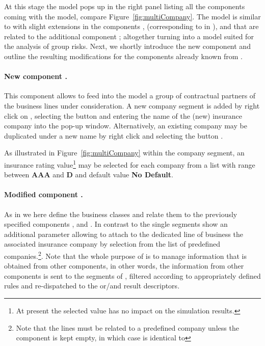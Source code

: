 At this stage the model pops up in the right panel listing all the components coming with the model, compare Figure~\ref{fig:multiCompany}.
The model is similar to \PODRA{} with slight extensions in the components ,   (corresponding to  in \PODRA), and 
that are related to the additional component ; altogether turning \PODRA{} into a model suited for the analysis of group risks.
Next, we shortly introduce the new component and outline the resulting modifications for
the components already known from \PODRA.

\paragraph{New component .}
This component allows to feed into the model a group of contractual partners of the business lines under consideration.
A new company segment is added by right click on , selecting the button  and entering the
name of the (new) insurance company into the pop-up window. Alternatively, an existing company may be duplicated under a new name by right
click and selecting the button .

As illustrated in Figure~\ref{fig:multiCompany} within the company segment, an insurance rating value\footnote{At present the selected value has no impact on the simulation results.} may
be selected for each company from a list with range between \textbf{AAA} and \textbf{D} and default value \textbf{No Default}.


\paragraph{Modified component .}
As in \PODRA{} we here define the business classes and relate them to the previously specified components ,  and . In contrast to \PODRA{} the single segments show an additional parameter  allowing to attach to the dedicated line of business
the associated insurance company by selection from the list of predefined companies.\footnote{Note that the lines must be related to a predefined company unless the component  is kept empty, in which case  is identical to \PODRA}.
Note that the whole purpose of  is to manage information that is obtained from other components, in other words, the information from other components is sent to the segments of , filtered according to appropriately defined rules and re-dispatched to the  or/and result descriptors.

